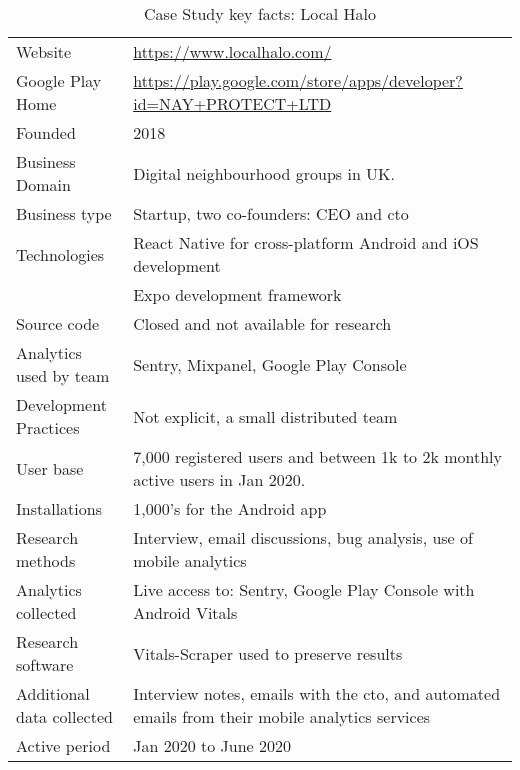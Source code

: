 {\renewcommand{\arraystretch}{0.8}%
\begin{table*}
    \centering
    \small
    \setlength{\tabcolsep}{6pt}
    \begin{tabular}{lp{11cm}}
       \toprule
       Website &\url{https://www.localhalo.com/} \\
       Google Play Home & \url{https://play.google.com/store/apps/developer?id=NAY+PROTECT+LTD} \\
       Founded &2018 \\
       Business Domain &Digital neighbourhood groups in UK.\\
       Business type &Startup, two co-founders: CEO and \acrshort{cto} \\
       Technologies  &React Native for cross-platform Android and iOS development \\
       &Expo development framework \\
       Source code  &Closed and not available for research \\
       Analytics used by team &Sentry, Mixpanel, Google Play Console \\
       Development Practices &Not explicit, a small distributed team \\
       \midrule
       User base &7,000 registered users and between 1k to 2k monthly active users in Jan 2020. \\
       Installations &1,000's for the Android app \\
       \midrule
       Research methods &Interview, email discussions, bug analysis, use of mobile analytics \\
       Analytics collected &Live access to: Sentry, Google Play Console with Android Vitals \\
       Research software &Vitals-Scraper used to preserve results \\
       Additional data collected &Interview notes, emails with the \acrshort{cto}, and automated emails from their mobile analytics services \\
       Active period &Jan 2020 to June 2020 \\
       \bottomrule
    \end{tabular}
    \caption{Case Study key facts: Local Halo}
    \label{tab:local_halo_anaytics_overview}
\end{table*}
}

